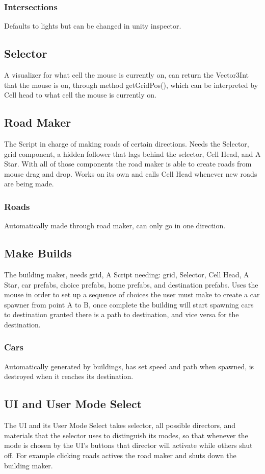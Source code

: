 \documentclass[10pt,twocolumn]{article}
\begin{document}
\subsubsection{Intersections}
Defaults to lights but can be changed in unity inspector.
\subsection{Selector}
A visualizer for what cell the mouse is currently on, can return the Vector3Int that the mouse is on, through method getGridPos(), which can be interpreted by Cell head to what cell the mouse is currently on.
\subsection{Road Maker}
The Script in charge of making roads of certain directions. Needs the Selector, grid component, a hidden follower that lags behind the selector, Cell Head, and A Star. With all of those components the road maker is able to create roads from mouse drag and drop. Works on its own and calls Cell Head whenever new roads are being made. 
\subsubsection{Roads}
Automatically made through road maker, can only go in one direction.
\subsection{Make Builds}
The building maker, needs grid, 
A Script needing: grid, Selector, Cell Head, A Star, car prefabs, choice prefabs, home prefabs, and destination prefabs. Uses the mouse in order to set up a sequence of choices the user must make to create a car spawner from point A to B, once complete the building will start spawning cars to destination granted there is a path to destination, and vice versa for the destination.
\subsubsection{Cars}
Automatically generated by buildings, has set speed and path when spawned, is destroyed when it reaches its destination.
\subsection{UI and User Mode Select}
The UI and its User Mode Select takes selector, all possible directors, and materials that the selector uses to distinguish its modes, so that whenever the mode is chosen by the UI's buttons that director will activate while others shut off. For example clicking roads actives the road maker and shuts down the building maker. 


\printbibliography
\end{document}

